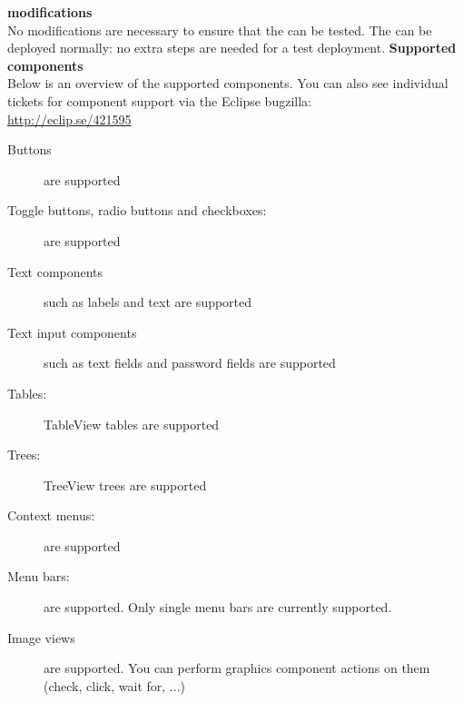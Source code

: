 \textbf{\gdaut{} modifications}\\
No modifications are necessary to ensure that the \gdaut{} can be tested. The \gdaut{} can be deployed normally: no extra steps are needed for a test deployment.
\textbf{Supported components}\\
Below is an overview of the supported components. You can also see individual tickets for component support via the Eclipse bugzilla:\\
\url{http://eclip.se/421595}
\begin{description}
\item [Buttons]{are supported}
\item [Toggle buttons, radio buttons and checkboxes:]{are supported}
\item [Text components]{such as labels and text are supported}
\item [Text input components]{such as text fields and password fields are supported}
\item [Tables:]{TableView tables are supported}
\item [Trees:]{TreeView trees are supported}
\item [Context menus:]{are supported}
\item [Menu bars:]{are supported. Only single menu bars are currently supported.}
\item [Image views]{are supported. You can perform graphics component actions on them (check, click, wait for, ...)}
\end{description}
